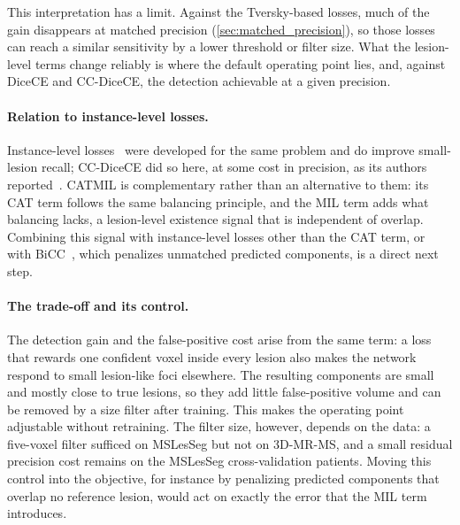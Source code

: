 This interpretation has a limit. Against the Tversky-based losses, much of
the gain disappears at matched precision (\cref{sec:matched_precision}), so
those losses can reach a similar sensitivity by a lower threshold or filter
size. What the lesion-level terms change reliably is where the default operating point lies, and,
against DiceCE and CC-DiceCE, the detection achievable at a given
precision.

\paragraph{Relation to instance-level losses.}
Instance-level losses~\cite{shirokikh_universal_2020,kofler_blob_2023,bouteille_learning_2026}
were developed for the same problem and do improve small-lesion recall;
CC-DiceCE did so here, at some cost in precision, as its authors
reported~\cite{bouteille_learning_2026}. CATMIL is complementary rather
than an alternative to them: its CAT term follows the same balancing
principle, and the MIL term adds what balancing lacks, a lesion-level
existence signal that is independent of overlap. Combining this signal
with instance-level losses other than the CAT term, or with
BiCC~\cite{bouteille_bicc_2026}, which penalizes unmatched predicted
components, is a direct next step.

\paragraph{The trade-off and its control.}
The detection gain and the false-positive cost arise from the same term:
a loss that rewards one confident voxel inside every lesion also makes the
network respond to small lesion-like foci elsewhere. The resulting
components are small and mostly close to true lesions, so they add little
false-positive volume and can be removed by a size filter after training.
This makes the operating point adjustable without retraining. The filter
size, however, depends on the data: a five-voxel filter sufficed on
MSLesSeg but not on 3D-MR-MS, and a small residual precision cost remains
on the MSLesSeg cross-validation patients. Moving this control into the
objective, for instance by penalizing predicted components that overlap no
reference lesion, would act on exactly the error that the MIL term
introduces.

